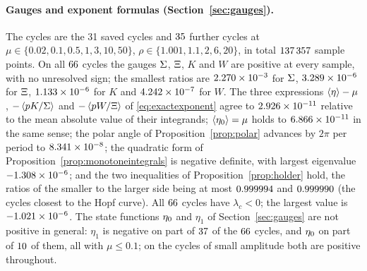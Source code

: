 \paragraph{Gauges and exponent formulas (Section~\ref{sec:gauges}).}
The cycles are the 31 saved cycles and $35$ further cycles at $\mu\in\{0.02,0.1,0.5,1,3,10,50\}$, $\rho\in\{1.001,1.1,2,6,20\}$, in total $137\,357$ sample points. On all $66$ cycles the gauges $\Sigma$, $\Xi$, $K$ and $W$ are positive at every sample, with no unresolved sign; the smallest ratios are $2.270\times10^{-3}$ for $\Sigma$, $3.289\times10^{-6}$ for $\Xi$, $1.133\times10^{-6}$ for $K$ and $4.242\times10^{-7}$ for $W$. The three expressions $\left\langle \eta\right\rangle-\mu$, $-\left\langle pK/\Sigma\right\rangle$ and $-\left\langle pW/\Xi\right\rangle$ of \eqref{eq:exactexponent} agree to $2.926\times10^{-11}$ relative to the mean absolute value of their integrands; $\left\langle \eta_0\right\rangle=\mu$ holds to $6.866\times10^{-11}$ in the same sense; the polar angle of Proposition~\ref{prop:polar} advances by $2\pi$ per period to $8.341\times10^{-8}$; the quadratic form of Proposition~\ref{prop:monotoneintegrals} is negative definite, with largest eigenvalue $-1.308\times10^{-6}$; and the two inequalities of Proposition~\ref{prop:holder} hold, the ratios of the smaller to the larger side being at most $0.999994$ and $0.999990$ (the cycles closest to the Hopf curve). All $66$ cycles have $\lambda_c<0$; the largest value is $-1.021\times10^{-6}$. The state functions $\eta_0$ and $\eta_1$ of Section~\ref{sec:gauges} are not positive in general: $\eta_1$ is negative on part of $37$ of the $66$ cycles, and $\eta_0$ on part of $10$ of them, all with $\mu\le0.1$; on the cycles of small amplitude both are positive throughout.

